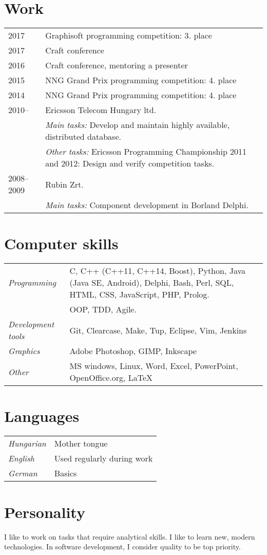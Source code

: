 \documentclass[a4paper,10pt]{article}
\newcommand{\pont}[1]{\emph{#1}}
\begin{document}
\section*{Work}
\begin{tabular}{lp{10cm}}
 2017&Graphisoft programming competition: 3. place\\
 2017&Craft conference\\
 2016&Craft conference, mentoring a presenter\\
 2015&NNG Grand Prix programming competition: 4. place\\
 2014&NNG Grand Prix programming competition: 4. place\\
 2010--&Ericsson Telecom Hungary ltd.\\
  &\emph{Main tasks:} Develop and maintain highly available, distributed database.\\
  &\emph{Other tasks:} Ericsson Programming Championship 2011 and 2012: Design and verify competition tasks.\\
 2008--2009&Rubin Zrt.\\
  &\emph{Main tasks:} Component development in Borland Delphi.
\end{tabular}

\section*{Computer skills}
\begin{tabular}{lp{12cm}}
 \pont{Programming}&C, C++ (C++11, C++14, Boost), Python, Java (Java SE, Android), Delphi, Bash, Perl, SQL, HTML, CSS, JavaScript, PHP, Prolog.\\
 &OOP, TDD, Agile.\\
 \pont{Development tools}&Git, Clearcase, Make, Tup, Eclipse, Vim, Jenkins\\
 \pont{Graphics}&Adobe Photoshop, GIMP, Inkscape\\
 \pont{Other}&MS windows, Linux, Word, Excel, PowerPoint, OpenOffice.org, LaTeX
\end{tabular}

\section*{Languages}
\begin{tabular}{ll}
 \pont{Hungarian}&Mother tongue\\
 \pont{English}&Used regularly during work\\
 \pont{German}&Basics
\end{tabular}

\section*{Personality}
I like to work on tasks that require analytical skills. I like to learn new, modern technologies. In software development, I consider quality to be top priority.
\end{document}
